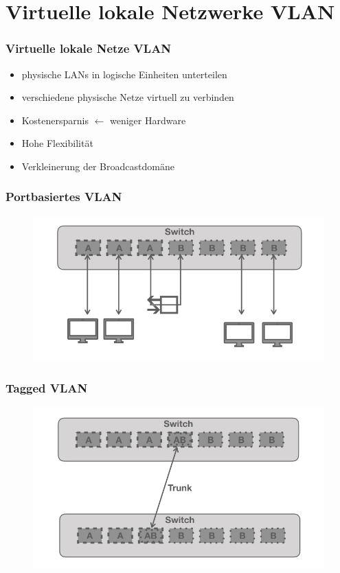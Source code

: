 \documentclass[hyperref={pdfpagelabels=false},xcolor=dvipsnames]{beamer}
\newcommand*\mi{ \item[\color{gray}\scalebox{1.2}{\textbullet}]}
\begin{document}
\section{Virtuelle lokale Netzwerke VLAN}
%
\begin{frame}
	\frametitle{Virtuelle lokale Netze VLAN}
	\begin{itemize}
		\mi  physische LANs in logische Einheiten unterteilen
		\mi verschiedene physische Netze virtuell zu verbinden
		\mi Kostenersparnis $\leftarrow$ weniger Hardware
		\mi Hohe Flexibilität
		\mi Verkleinerung der Broadcastdomäne
		 
		
	\end{itemize}

\end{frame}

\begin{frame}

	\frametitle{Portbasiertes VLAN}
	
	\begin{figure}
	\includegraphics[width=\textwidth]{vlan.001.jpeg}	
	\end{figure}
		
\end{frame}

\begin{frame}
	\frametitle{Tagged VLAN}
		\begin{figure}
	\includegraphics[width=\textwidth]{vlan.002.jpeg}	
	\end{figure}	
\end{frame}
\end{document}
